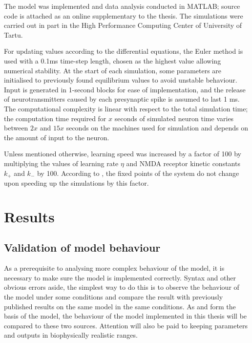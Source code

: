 \documentclass[a4paper,12pt]{report}
\theoremstyle{definition}
\begin{document}
The model was implemented and data analysis conducted in MATLAB; source code is attached as an online supplementary to the thesis. The simulations were carried out in part in the High Performance Computing Center of University of Tartu.

For updating values according to the differential equations, the Euler method is used with a 0.1ms time-step length, chosen as the highest value allowing numerical stability. At the start of each simulation, some parameters are initialised to previously found equilibrium values to avoid unstable behaviour. Input is generated in 1-second blocks for ease of implementation, and the release of neurotransmitters caused by each presynaptic spike is assumed to last 1 ms. The computational complexity is linear with respect to the total simulation time; the computation time required for $x$ seconds of simulated neuron time varies between $2x$ and $15x$ seconds on the machines used for simulation and depends on the amount of input to the neuron.

Unless mentioned otherwise, learning speed was increased by a factor of 100 by multiplying the values of learning rate $\eta$ and NMDA receptor kinetic constants $k_+$ and $k_-$ by 100. According to \cite{yeung2004synaptic}, the fixed points of the system do not change upon speeding up the simulations by this factor.











\chapter{Results}

\section{Validation of model behaviour}

As a prerequisite to analysing more complex behaviour of the model, it is necessary to make sure the model is implemented correctly. Syntax and other obvious errors aside, the simplest way to do this is to observe the behaviour of the model under some conditions and compare the result with previously published results on the same model in the same conditions. As \cite{shouval2002unified} and \cite{yeung2004synaptic} form the basis of the model, the behaviour of the model implemented in this thesis will be compared to these two sources. Attention will also be paid to keeping parameters and outputs in biophysically realistic ranges.
\end{document}
